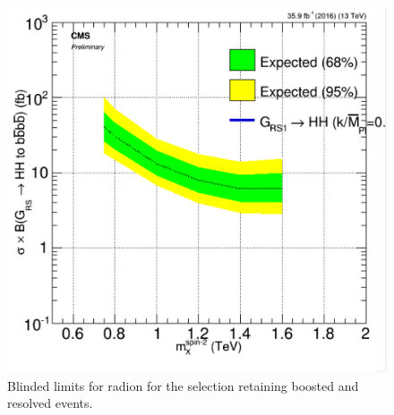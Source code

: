 \begin{figure}[thb!]
\begin{center}
\includegraphics[scale=0.5]{Figures/brazflag_Rad_none_v2.pdf}
\end{center}
\caption{Blinded limits for radion for the selection retaining boosted and resolved events.}
\label{fig:radblindnone}
\end{figure} 





